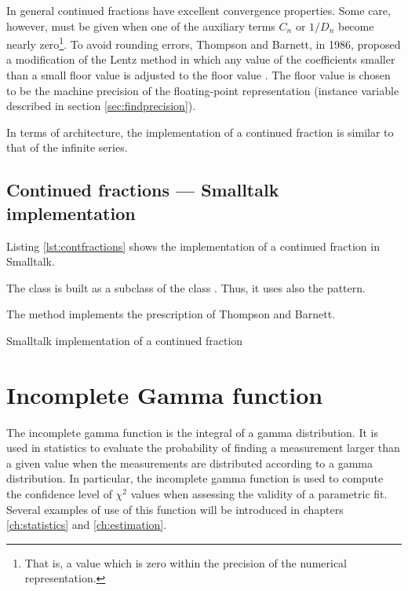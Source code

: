 In general continued fractions have excellent convergence
properties. Some care, however, must be given when one of the
auxiliary terms $C_n$ or $1/D_n$ become nearly zero\footnote{That
is, a value which is zero within the precision of the numerical
representation.}. To avoid rounding errors, Thompson and Barnett,
in 1986, proposed a modification of the Lentz method in which any
value of the coefficients smaller than a small floor value is
adjusted to the floor value \cite{Press}. The floor value is
chosen to be the machine precision of the floating-point
representation (instance variable  described in
section \ref{sec:findprecision}).

In terms of architecture, the implementation of a continued
fraction is similar to that of the infinite series.

\subsection{Continued fractions --- Smalltalk  implementation}
Listing \ref{lst:contfractions} shows the implementation of a continued fraction in Smalltalk.

The class  is built as a subclass of the
class . Thus, it uses also the
 pattern.

The method  implements the prescription of
Thompson and Barnett.
\begin{listing} Smalltalk implementation of a continued fraction \label{ls:contfractions}

\end{listing}

\section{Incomplete Gamma function}
\label{sec:incGamma} The incomplete gamma function is the integral
of a gamma distribution. It is used in statistics to evaluate the
probability of finding a measurement larger than a given value
when the measurements are distributed according to a gamma
distribution. In particular, the incomplete gamma function is used
to compute the confidence level of $\chi^2$ values when assessing
the validity of a parametric fit. Several examples of use of this
function will be introduced in chapters \ref{ch:statistics} and
\ref{ch:estimation}.

